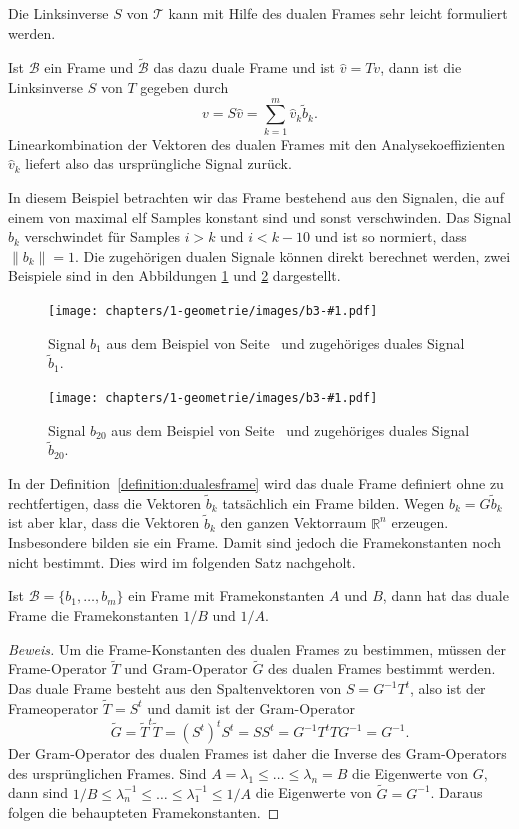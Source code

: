 Die Linksinverse $S$ von $\mathcal{T}$ kann mit Hilfe des dualen Frames
sehr leicht formuliert werden.

\begin{satz}
Ist $\mathcal{B}$ ein Frame und $\tilde{\mathcal{B}}$ das dazu duale
Frame und ist $\hat{v} = Tv$, dann ist die Linksinverse $S$ von $T$
gegeben durch
\[
v
=
S\hat{v}
=
\sum_{k=1}^m \hat{v}_k \tilde{b}_k.
\]
Linearkombination der Vektoren des dualen Frames mit den Analysekoeffizienten
$\hat{v}_k$ liefert also das ursprüngliche Signal zurück.
\end{satz}

\begin{beispiel}
\label{beispiel3}
In diesem Beispiel betrachten wir das Frame bestehend aus den
Signalen, die auf einem von maximal elf Samples konstant sind
und sonst verschwinden.
Das Signal $b_k$ verschwindet für Samples $i>k$ und $i<k-10$
und ist so normiert, dass $\|b_k\|=1$.
Die zugehörigen dualen Signale können direkt berechnet werden,
zwei Beispiele sind in den Abbildungen \ref{b3-01} und \ref{b3-05}
dargestellt.
\def\beispieldrei#1#2{
\begin{figure}
\centering
\texttt{[image: chapters/1-geometrie/images/b3-\#1.pdf]}
\caption{Signal $b_{#2}$ aus dem Beispiel von Seite~\pageref{beispiel3}
und zugehöriges duales Signal $\tilde{b}_{#2}$.
\label{b3-#1}}
\end{figure}
}
\beispieldrei{01}{1}
\beispieldrei{05}{20}
\end{beispiel}

In der Definition~\ref{definition:dualesframe} wird das duale Frame
definiert ohne zu rechtfertigen, dass die Vektoren $\tilde{b}_k$ 
tatsächlich ein Frame bilden.
Wegen $b_k=G\tilde{b}_k$ ist aber klar, dass die Vektoren $\tilde{b}_k$
den ganzen Vektorraum $\mathbb R^n$ erzeugen.
Insbesondere bilden sie ein Frame.
Damit sind jedoch die Framekonstanten noch nicht bestimmt.
Dies wird im folgenden Satz nachgeholt.

\begin{satz}
Ist $\mathcal{B}=\{b_1,\dots,b_m\}$ ein Frame mit Framekonstanten
$A$ und $B$, dann hat das duale Frame die Framekonstanten $1/B$ und $1/A$.
\end{satz}

\begin{proof}[Beweis]
Um die Frame-Konstanten des dualen Frames zu bestimmen,
müssen der Frame-Operator $\tilde{T}$ und Gram-Operator $\tilde{G}$
des dualen Frames bestimmt werden.
Das duale Frame besteht aus den Spaltenvektoren von $S=G^{-1}T^t$,
also ist der Frameoperator $\tilde{T}=S^t$ und damit ist der Gram-Operator
\[
\tilde{G}
=
\tilde{T}^t\tilde{T}
=
(S^t)^tS^t
=
SS^t
=
G^{-1}T^tTG^{-1}
=
G^{-1}.
\]
Der Gram-Operator des dualen Frames ist daher die Inverse des
Gram-Operators des ursprünglichen Frames.
Sind $A=\lambda_1\le \dots\le \lambda_n=B$ die Eigenwerte  von $G$,
dann sind
$1/B\le \lambda_n^{-1} \le \dots \le \lambda_1^{-1}\le 1/A$ 
die Eigenwerte von $\tilde{G}=G^{-1}$.
Daraus folgen die behaupteten Framekonstanten.
\end{proof}

